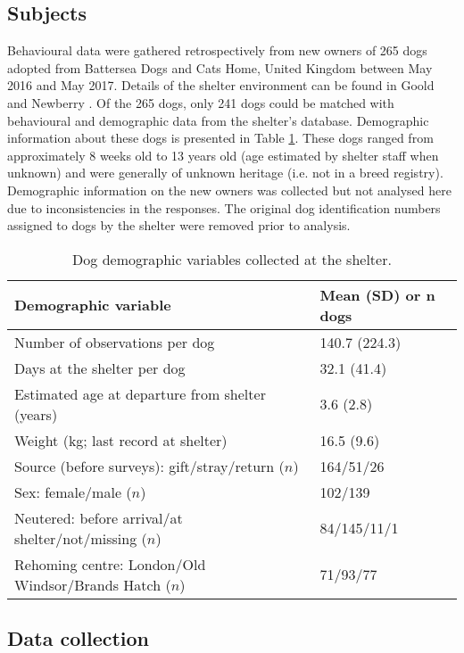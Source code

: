 \documentclass[fleqn,10pt]{wlscirep}
\begin{document}
\subsection*{Subjects}
Behavioural data were gathered retrospectively from new owners of 265 dogs adopted from Battersea Dogs and Cats Home, United Kingdom between May 2016 and May 2017. Details of the shelter environment can be found in Goold and Newberry \cite{goold2017aggressiveness,goold2017modelling}. Of the 265 dogs, only 241 dogs could be matched with behavioural and demographic data from the shelter's database. Demographic information about these dogs is presented in Table \ref{table_demoshelter}. These dogs ranged from approximately 8 weeks old to 13 years old (age estimated by shelter staff when unknown) and were generally of unknown heritage (i.e. not in a breed registry). Demographic information on the new owners was collected but not analysed here due to inconsistencies in the responses. The original dog identification numbers assigned to dogs by the shelter were removed prior to analysis.

\begin{table}
  \centering
  \begin{tabular}{ll}
  \textbf{Demographic variable} & \textbf{Mean (SD) or $\boldsymbol{n}$ dogs}\\ \hline
  Number of observations per dog & 140.7 (224.3) \\
  Days at the shelter per dog & 32.1 (41.4)\\
  Estimated age at departure from shelter (years) & 3.6 (2.8)\\
  Weight (kg; last record at shelter) & 16.5 (9.6)\\
  Source (before surveys): gift/stray/return ($n$) & 164/51/26\\
  Sex: female/male ($n$) & 102/139\\
  Neutered: before arrival/at shelter/not/missing ($n$) & 84/145/11/1\\
  Rehoming centre: London/Old Windsor/Brands Hatch ($n$) & 71/93/77\\
  \hline
  \end{tabular}
  \caption{Dog demographic variables collected at the shelter.}
  \label{table_demoshelter}
\end{table}

\subsection*{Data collection}
\end{document}
